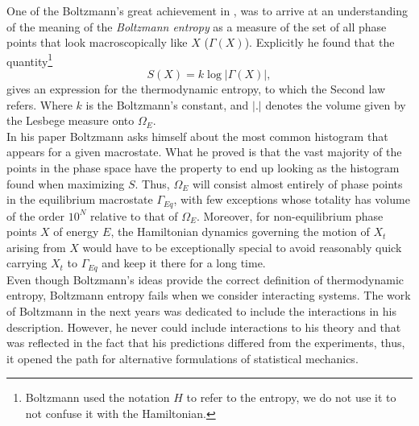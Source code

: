 \indent One of the Boltzmann's great achievement in  \cite{boltzmann1871prioritat}, was to arrive at an understanding of the meaning of the \textit{Boltzmann entropy} as a measure of the set of all phase points that look macroscopically like $X$ ($\Gamma(X)$). Explicitly he found that the quantity\footnote{Boltzmann used the notation $H$ to refer to the entropy, we do not use it to not confuse it with the Hamiltonian. }
\begin{equation}
S(X)= k \log |\Gamma(X)|,
\label{CH1:Boltzmann_entropy}
\end{equation}
gives an expression for the thermodynamic entropy, to which the Second law refers. Where $k$ is the Boltzmann's constant, and $|.|$ denotes the volume given by the Lesbege measure onto $\Omega_E$.\\
\indent In his paper \cite{boltzmann1871prioritat} Boltzmann asks himself about the most common histogram that appears for a given macrostate. What he proved is that the vast majority of the points in the phase space have the property to end up looking as the histogram found when maximizing $S$. Thus, $\Omega_E$ will consist almost entirely of phase points in the equilibrium macrostate $\Gamma_{Eq}$, with few exceptions whose totality has volume of the order $10^N$ relative to that of $\Omega_E$. Moreover, for non-equilibrium phase points $X$ of energy $E$, the Hamiltonian dynamics governing the motion of $X_t$ arising from $X$ would have to be exceptionally special to avoid reasonably quick carrying $X_t$ to $\Gamma_{Eq}$ and keep it there for a long time. \\
\indent Even though Boltzmann's ideas provide the correct definition of thermodynamic entropy, Boltzmann entropy fails when we consider interacting systems\cite{garrido_boltzmann_2004, goldstein_boltzmann_2004 }. The work of Boltzmann in the next years \cite{boltzmann1866mechanische, boltzmann1877beziehung} was dedicated to include the interactions in his description. However, he never could include interactions to his theory and that was reflected in the fact that his predictions differed from the experiments, thus, it opened the path for alternative formulations of statistical mechanics.
